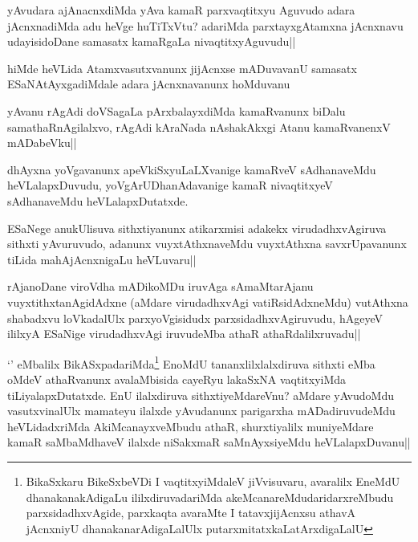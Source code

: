 \begin{artha}
yAvudara ajAnacnxdiMda yAva kamaR parxvaqtitxyu Aguvudo adara jAcnxnadiMda adu heVge huTiTxVtu? adariMda parxtayxgAtamxna jAcnxnavu udayisidoDane samasatx kamaRgaLa nivaqtitxyAguvudu||
\end{artha}

\begin{artha}
hiMde heVLida Atamxvasutxvanunx jijAcnxse mADuvavanU samasatx ESaNAtAyxgadiMdale adara jAcnxnavanunx hoMduvanu
\end{artha}

\begin{artha}
yAvanu rAgAdi doVSagaLa pArxbalayxdiMda kamaRvanunx biDalu samathaRnAgilalxvo, rAgAdi kAraNada nAshakAkxgi Atanu kamaRvanenxV mADabeVku||
\end{artha}


\begin{artha}%
dhAyxna yoVgavanunx apeVkiSxyuLaLXvanige kamaRveV sAdhanaveMdu heVLalapxDuvudu, yoVgArUDhanAdavanige kamaR nivaqtitxyeV sAdhanaveMdu heVLalapxDutatxde.
\end{artha}

\begin{artha}
ESaNege anukUlisuva sithxtiyanunx atikarxmisi adakekx virudadhxvAgiruva sithxti yAvuruvudo, adanunx vuyxtAthxnaveMdu vuyxtAthxna savxrUpavanunx tiLida mahAjAcnxnigaLu heVLuvaru||
\end{artha}


\begin{artha}
rAjanoDane viroVdha mADikoMDu iruvAga sAmaMtarAjanu vuyxtithxtanAgidAdxne (aMdare virudadhxvAgi vatiRsidAdxneMdu) vutAthxna shabadxvu loVkadalUlx parxyoVgisidudx parxsidadhxvAgiruvudu, hAgeyeV ililxyA ESaNige virudadhxvAgi iruvudeMba athaR athaRdalilxruvadu||
\end{artha}


\begin{artha}
`\stext ' eMbalilx BikASxpadariMda\footnote[1]{BikaSxkaru BikeSxbeVDi I vaqtitxyiMdaleV jiVvisuvaru, avaralilx EneMdU dhanakanakAdigaLu ililxdiruvadariMda  akeMcanareMdudaridarxreMbudu parxsidadhxvAgide, parxkaqta avaraMte I tatavxjijAcnxsu athavA jAcnxniyU dhanakanarAdigaLalUlx putarxmitatxkaLatArxdigaLalU} EnoMdU tananxlilxlalxdiruva sithxti eMba oMdeV athaRvanunx avalaMbisida cayeRyu lakaSxNA vaqtitxyiMda tiLiyalapxDutatxde. EnU ilalxdiruva sithxtiyeMdareVnu? aMdare yAvudoMdu vasutxvinalUlx mamateyu ilalxde yAvudanunx parigarxha mADadiruvudeMdu heVLidadxriMda AkiMcanayxveMbudu athaR, shurxtiyalilx muniyeMdare kamaR saMbaMdhaveV ilalxde niSakxmaR saMnAyxsiyeMdu heVLalapxDuvanu||
\end{artha}%

